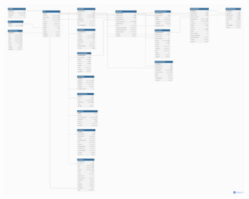 \documentclass[12pt,a4paper]{article}
\begin{document}
    \includegraphics[width=0.95\textwidth]{diagrams/Picture/Database.png}
\end{document}
